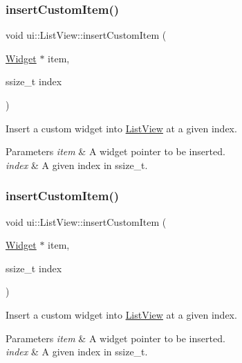 \subsubsection{\texorpdfstring{insert\+Custom\+Item()}{insertCustomItem()}\hspace{0.1cm}{\footnotesize\ttfamily [1/2]}}
{\footnotesize\ttfamily void ui\+::\+List\+View\+::insert\+Custom\+Item (\begin{DoxyParamCaption}\item[{\hyperlink{classui_1_1Widget}{Widget} $\ast$}]{item,  }\item[{ssize\+\_\+t}]{index }\end{DoxyParamCaption})}



Insert a custom widget into \hyperlink{classui_1_1ListView}{List\+View} at a given index. 


\begin{DoxyParams}{Parameters}
{\em item} & A widget pointer to be inserted. \\
\hline
{\em index} & A given index in ssize\+\_\+t. \\
\hline
\end{DoxyParams}
\mbox{\label{classui_1_1ListView_ab6e5f75b2cdf36871d994fccd55c75ae}} 
\subsubsection{\texorpdfstring{insert\+Custom\+Item()}{insertCustomItem()}\hspace{0.1cm}{\footnotesize\ttfamily [2/2]}}
{\footnotesize\ttfamily void ui\+::\+List\+View\+::insert\+Custom\+Item (\begin{DoxyParamCaption}\item[{\hyperlink{classui_1_1Widget}{Widget} $\ast$}]{item,  }\item[{ssize\+\_\+t}]{index }\end{DoxyParamCaption})}



Insert a custom widget into \hyperlink{classui_1_1ListView}{List\+View} at a given index. 


\begin{DoxyParams}{Parameters}
{\em item} & A widget pointer to be inserted. \\
\hline
{\em index} & A given index in ssize\+\_\+t. \\
\hline
\end{DoxyParams}
\mbox{\label{classui_1_1ListView_aca5f63e916a28a84842f8a1bc4320cdb}} 
